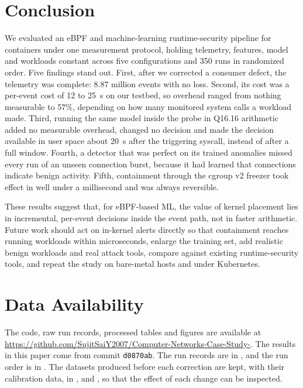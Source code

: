 \section{Conclusion}
\label{sec:conclusion}

We evaluated an eBPF and machine-learning runtime-security pipeline for containers under one measurement protocol, holding telemetry, features, model and workloads constant across five configurations and 350 runs in randomized order. Five findings stand out. First, after we corrected a consumer defect, the telemetry was complete: 8.87 million events with no loss. Second, its cost was a per-event cost of 12 to 25~\textmu s on our testbed, so overhead ranged from nothing measurable to 57\%, depending on how many monitored system calls a workload made. Third, running the same model inside the probe in Q16.16 arithmetic added no measurable overhead, changed no decision and made the decision available in user space about 20~\textmu s after the triggering syscall, instead of after a full window. Fourth, a detector that was perfect on its trained anomalies missed every run of an unseen connection burst, because it had learned that connections indicate benign activity. Fifth, containment through the cgroup v2 freezer took effect in well under a millisecond and was always reversible.

These results suggest that, for eBPF-based ML, the value of kernel placement lies in incremental, per-event decisions inside the event path, not in faster arithmetic. Future work should act on in-kernel alerts directly so that containment reaches running workloads within microseconds, enlarge the training set, add realistic benign workloads and real attack tools, compare against existing runtime-security tools, and repeat the study on bare-metal hosts and under Kubernetes.

\section*{Data Availability}

\begingroup\raggedright
The code, raw run records, processed tables and figures are available at \url{https://github.com/SujitSaiY2007/Computer-Networks-Case-Study-}. The results in this paper come from commit \texttt{d0870ab}. The run records are in , and the run order is in . The datasets produced before each correction are kept, with their calibration data, in ,  and , so that the effect of each change can be inspected.
\par\endgroup
